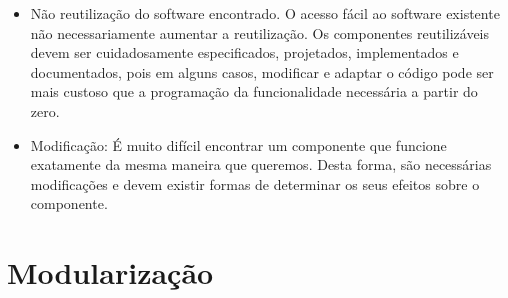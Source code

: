 \begin{itemize}
\item Não reutilização do software encontrado. O acesso fácil ao software existente
não necessariamente aumentar a reutilização. Os componentes reutilizáveis devem ser cuidadosamente especificados, projetados, implementados e documentados, pois em alguns casos, modificar e adaptar o código  pode ser mais custoso que a programação da funcionalidade necessária a partir do zero.

\item Modificação: É muito difícil encontrar um componente que funcione
exatamente da mesma maneira que queremos. Desta forma, são necessárias modificações e devem existir formas de determinar os seus efeitos sobre o componente.


\end{itemize}




\section{Modularização}\label{sec:modularizacao} %




